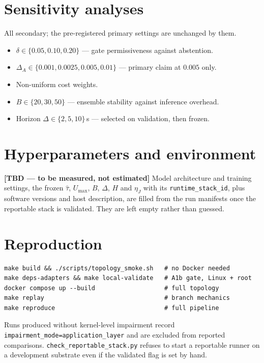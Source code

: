 \documentclass[journal]{IEEEtran}
\newcommand{\TBD}{\textbf{[TBD --- to be measured, not estimated]}}
\begin{document}
\section{Sensitivity analyses}
\label{sec:sens}
All secondary; the pre-registered primary settings are unchanged by them.
\begin{itemize}
\item $\delta\in\{0.05,0.10,0.20\}$ --- gate permissiveness against abstention.
\item $\Delta_A\in\{0.001,0.0025,0.005,0.01\}$ --- primary claim at $0.005$ only.
\item Non-uniform cost weights.
\item $B\in\{20,30,50\}$ --- ensemble stability against inference overhead.
\item Horizon $\Delta\in\{2,5,10\}$\,s --- selected on validation, then frozen.
\end{itemize}

\section{Hyperparameters and environment}
\TBD{} Model architecture and training settings, the frozen $\hat\tau$,
$U_{\max}$, $B$, $\Delta$, $H$ and $\eta_J$ with its
\texttt{runtime\_stack\_id}, plus software versions and host description, are
filled from the run manifests once the reportable stack is validated. They are
left empty rather than guessed.

\section{Reproduction}
\begin{verbatim}
make build && ./scripts/topology_smoke.sh   # no Docker needed
make deps-adapters && make local-validate   # A1b gate, Linux + root
docker compose up --build                   # full topology
make replay                                 # branch mechanics
make reproduce                              # full pipeline
\end{verbatim}
Runs produced without kernel-level impairment record
\texttt{impairment\_mode=application\_layer} and are excluded from reported
comparisons. \texttt{check\_reportable\_stack.py} refuses to start a reportable
runner on a development substrate even if the validated flag is set by hand.
\end{document}
